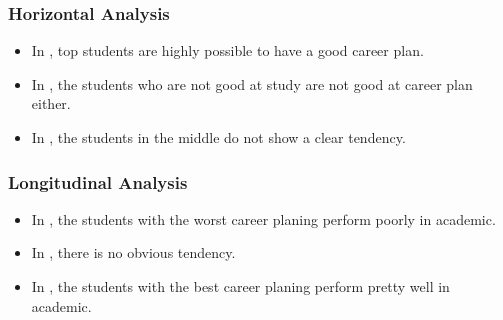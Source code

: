 \begin{frame}
    \frametitle{Horizontal Analysis}
    \Large
    \begin{itemize}[<+->]
        \item In , top students are highly possible to have a good career plan.
        \item In , the students who are not good at study are not good at career plan either.
        \item In , the students in the middle do not show a clear tendency.
    \end{itemize}
\end{frame}

\begin{frame}
    \frametitle{Longitudinal Analysis}
    \Large
    \begin{itemize}[<+->]
        \item In , the students with the worst career planing perform poorly in academic.
        \item In , there is no obvious tendency.
        \item In , the students with the best career planing perform pretty well in academic.
    \end{itemize}
\end{frame}
